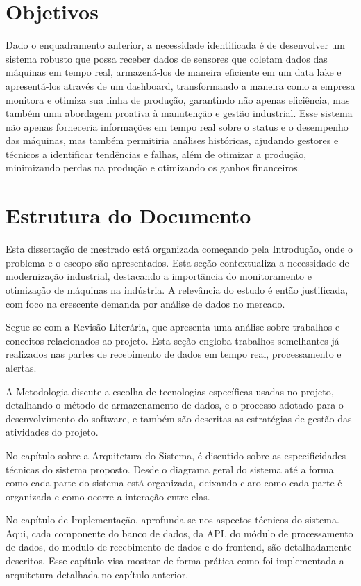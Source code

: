 \section{Objetivos}
Dado o enquadramento anterior, a necessidade identificada é de desenvolver um sistema robusto que possa receber dados de sensores que coletam dados das máquinas em tempo real, armazená-los de maneira eficiente em um data lake e apresentá-los através de um dashboard, transformando a maneira como a empresa monitora e otimiza sua linha de produção, garantindo não apenas eficiência, mas também uma abordagem proativa à manutenção e gestão industrial. Esse sistema não apenas forneceria informações em tempo real sobre o status e o desempenho das máquinas, mas também permitiria análises históricas, ajudando gestores e técnicos a identificar tendências e falhas, além de otimizar a produção, minimizando perdas na produção e otimizando os ganhos financeiros.

\section{Estrutura do Documento}
Esta dissertação de mestrado está organizada começando pela Introdução, onde o problema e o escopo são apresentados. Esta seção contextualiza a necessidade de modernização industrial, destacando a importância do monitoramento e otimização de máquinas na indústria. A relevância do estudo é então justificada, com foco na crescente demanda por análise de dados no mercado.

Segue-se com a Revisão Literária, que apresenta uma análise sobre trabalhos e conceitos relacionados ao projeto. Esta seção engloba trabalhos semelhantes já realizados nas partes de recebimento de dados em tempo real, processamento e alertas.

A Metodologia discute a escolha de tecnologias específicas usadas no projeto, detalhando o método de armazenamento de dados, e o processo adotado para o desenvolvimento do software, e também são descritas as estratégias de gestão das atividades do projeto.

No capítulo sobre a Arquitetura do Sistema, é discutido sobre as especificidades técnicas do sistema proposto. Desde o diagrama geral do sistema até a forma como cada parte do sistema está organizada, deixando claro como cada parte é organizada e como ocorre a interação entre elas.

No capítulo de Implementação, aprofunda-se nos aspectos técnicos do sistema. Aqui, cada componente do banco de dados, da \gls{API}, do módulo de processamento de dados, do modulo de recebimento de dados e do frontend, são detalhadamente descritos. Esse capítulo visa mostrar de forma prática como foi implementada a arquitetura detalhada no capítulo anterior.

